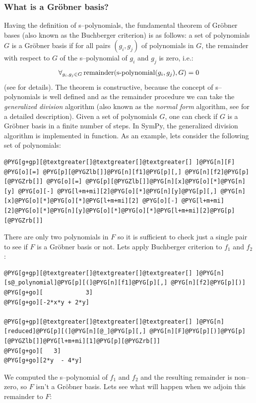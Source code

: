 \subsubsection{What is a Gröbner basis?}

Having the definition of s--polynomials, the fundamental theorem of Gröbner bases (also known as
the Buchberger criterion) is as follows: a set of polynomials $G$ is a Gröbner basis if for all
pairs $(g_i, g_j)$ of polynomials in $G$, the remainder with respect to $G$ of the s--polynomial
of $g_i$ and $g_j$ is zero, i.e.:
\begin{gather}
\begin{split}\forall_{g_i, g_j \in G} \operatorname{remainder}(\operatorname{s-polynomial}(g_i, g_j), G) = 0\end{split}\notag
\end{gather}
(see \cite{Adams1994intro} for details). The theorem is constructive, because the concept of
s--polynomials is well defined and as the remainder procedure we can take the \emph{generalized
division} algorithm (also known as the \emph{normal form} algorithm, see \cite{Cox1997ideals} for a
detailed description). Given a set of polynomials $G$, one can check if $G$ is a Gröbner
basis in a finite number of steps. In SymPy, the generalized division algorithm is implemented
in  function. As an example, lets consider the following set of polynomials:

\begin{Verbatim}[commandchars=@\[\]]
@PYG[g+gp][@textgreater[]@textgreater[]@textgreater[] ]@PYG[n][F] @PYG[o][=] @PYG[p][@PYGZlb[]]@PYG[n][f1]@PYG[p][,] @PYG[n][f2]@PYG[p][@PYGZrb[]] @PYG[o][=] @PYG[p][@PYGZlb[]]@PYG[n][x]@PYG[o][*]@PYG[n][y] @PYG[o][-] @PYG[l+m+mi][2]@PYG[o][*]@PYG[n][y]@PYG[p][,] @PYG[n][x]@PYG[o][*]@PYG[o][*]@PYG[l+m+mi][2] @PYG[o][-] @PYG[l+m+mi][2]@PYG[o][*]@PYG[n][y]@PYG[o][*]@PYG[o][*]@PYG[l+m+mi][2]@PYG[p][@PYGZrb[]]
\end{Verbatim}
\noindent
There are only two polynomials in $F$ so it is sufficient to check just a single pair to see
if $F$ is a Gröbner basis or not. Lets apply Buchberger criterion to $f_1$ and $f_2$:

\begin{Verbatim}[commandchars=@\[\]]
@PYG[g+gp][@textgreater[]@textgreater[]@textgreater[] ]@PYG[n][s@_polynomial]@PYG[p][(]@PYG[n][f1]@PYG[p][,] @PYG[n][f2]@PYG[p][)]
@PYG[g+go][            3]
@PYG[g+go][-2*x*y + 2*y]

@PYG[g+gp][@textgreater[]@textgreater[]@textgreater[] ]@PYG[n][reduced]@PYG[p][(]@PYG[n][@_]@PYG[p][,] @PYG[n][F]@PYG[p][)]@PYG[p][@PYGZlb[]]@PYG[l+m+mi][1]@PYG[p][@PYGZrb[]]
@PYG[g+go][   3]
@PYG[g+go][2*y  - 4*y]
\end{Verbatim}
\noindent
We computed the s--polynomial of $f_1$ and $f_2$ and the resulting remainder is non--zero, so
$F$ isn't a Gröbner basis. Lets see what will happen when we adjoin this remainder to $F$:

